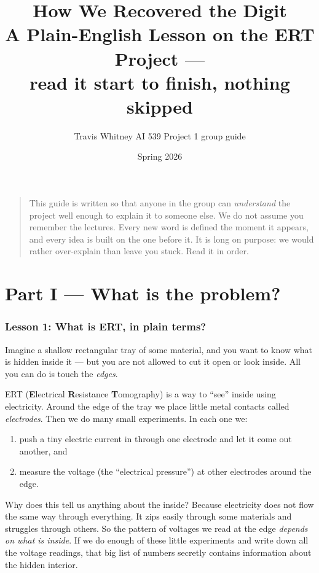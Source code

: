 \documentclass[11pt]{article}
\title{\textbf{How We Recovered the Digit}\\[6pt]
{\large A Plain-English Lesson on the ERT Project ---\\
read it start to finish, nothing skipped}}
\author{Travis Whitney \quad\textbar\quad AI 539 \quad\textbar\quad Project 1 group guide}
\date{Spring 2026}
\begin{document}
\maketitle

\begin{quote}
\small This guide is written so that anyone in the group can \emph{understand}
the project well enough to explain it to someone else. We do not assume you
remember the lectures. Every new word is defined the moment it appears, and
every idea is built on the one before it. It is long on purpose: we would
rather over-explain than leave you stuck. Read it in order.
\end{quote}

\tableofcontents
\newpage

\part*{Part I --- What is the problem?}

\section{Lesson 1: What is ERT, in plain terms?}

Imagine a shallow rectangular tray of some material, and you want to know
what is hidden inside it --- but you are not allowed to cut it open or look
inside. All you can do is touch the \emph{edges}.

ERT (\textbf{E}lectrical \textbf{R}esistance \textbf{T}omography) is a way to
``see'' inside using electricity. Around the edge of the tray we place little
metal contacts called \emph{electrodes}. Then we do many small experiments.
In each one we:

\begin{enumerate}[leftmargin=2em]
\item push a tiny electric current in through one electrode and let it come
out another, and
\item measure the voltage (the ``electrical pressure'') at other electrodes
around the edge.
\end{enumerate}

Why does this tell us anything about the inside? Because electricity does not
flow the same way through everything. It zips easily through some materials
and struggles through others. So the pattern of voltages we read at the edge
\emph{depends on what is inside}. If we do enough of these little experiments
and write down all the voltage readings, that big list of numbers secretly
contains information about the hidden interior.
\end{document}

